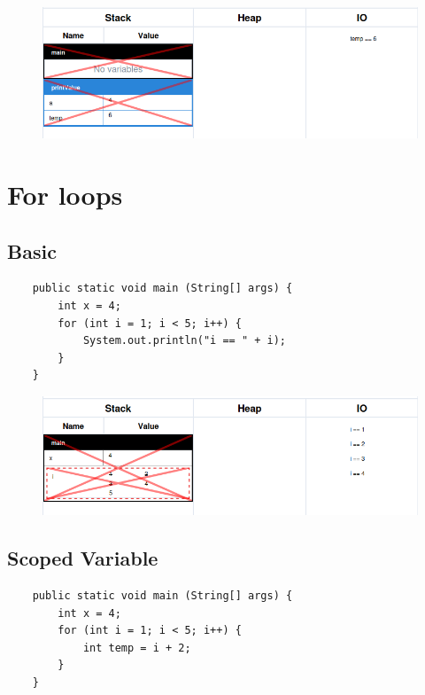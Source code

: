 \documentclass{article}
\begin{document}
\begin{figure}[H]
	\centering
	\includegraphics{functionNoReturn.png}
\end{figure}

\pagebreak

\section{For loops}

\subsection{Basic}

\begin{verbatim}
	public static void main (String[] args) {
	    int x = 4;
	    for (int i = 1; i < 5; i++) {
	        System.out.println("i == " + i);
	    }
	}
\end{verbatim}

\begin{figure}[H]
	\centering
	\includegraphics{forBasic.png}
\end{figure}

\subsection{Scoped Variable}

\begin{verbatim}
	public static void main (String[] args) {
	    int x = 4;
	    for (int i = 1; i < 5; i++) {
	        int temp = i + 2;
	    }
	}
\end{verbatim}
\end{document}
